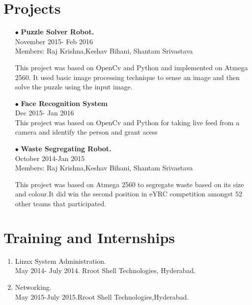 \documentclass[12pt]{article}
\begin{document}
\section*{Projects}
\begin{itemize}
\item[$\bullet$]\textbf{Puzzle Solver Robot.}\\November 2015- Feb 2016\\Members: Raj Krishna,Keshav Bihani, Shantam Srivastava

This project was based on OpenCv and Python and implemented on Atmega 2560. It used basic image processing technique to sense an image and then solve the puzzle using the input image.
\item[$\bullet$]\textbf{Face Recognition System}\\Dec 2015- Jan 2016\\

This project was based on OpenCv and Python for taking live feed from a camera and identify the person and grant acess
\item[$\bullet$]\textbf{Waste Segregating Robot.}\\October 2014-Jan 2015 \\Members: Raj Krishna,Keshav Bihani, Shantam Srivastava

This project was based on Atmega 2560 to segregate waste based on its size and colour.It did win the second position in eYRC competition amongst 52 other teams that participated.
\end{itemize}
\section*{Training and Internships}
\begin{enumerate}
\item Linux System Administration.\\May 2014- July 2014. Rroot Shell Technologies, Hyderabad.
\item Networking.\\May 2015-July 2015.Rroot Shell Technologies,Hyderabad.
\end{enumerate}
\end{document}
